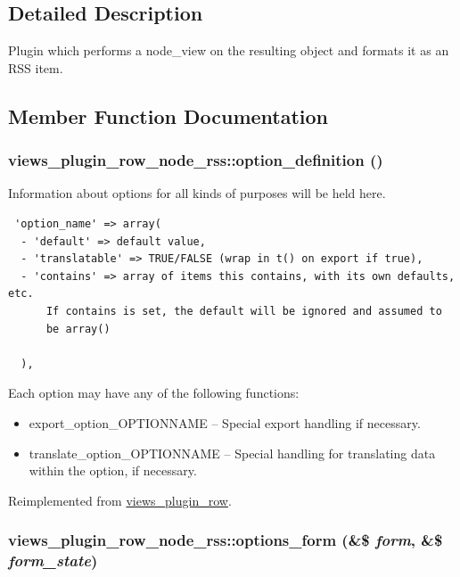 \subsection{Detailed Description}
Plugin which performs a node\_\-view on the resulting object and formats it as an RSS item. 

\subsection{Member Function Documentation}
\hypertarget{classviews__plugin__row__node__rss_160237bd0d2f6ee0e9c22cf7d08d8082}{
\subsubsection[{option\_\-definition}]{\setlength{\rightskip}{0pt plus 5cm}views\_\-plugin\_\-row\_\-node\_\-rss::option\_\-definition ()}}
\label{classviews__plugin__row__node__rss_160237bd0d2f6ee0e9c22cf7d08d8082}


Information about options for all kinds of purposes will be held here. 

\begin{Code}\begin{verbatim} 'option_name' => array(
  - 'default' => default value,
  - 'translatable' => TRUE/FALSE (wrap in t() on export if true),
  - 'contains' => array of items this contains, with its own defaults, etc.
      If contains is set, the default will be ignored and assumed to
      be array()

  ),
\end{verbatim}
\end{Code}

 Each option may have any of the following functions:\begin{itemize}
\item export\_\-option\_\-OPTIONNAME -- Special export handling if necessary.\item translate\_\-option\_\-OPTIONNAME -- Special handling for translating data within the option, if necessary. \end{itemize}


Reimplemented from \hyperlink{classviews__plugin__row_ad6be1492eae8605e9aff37da9f19337}{views\_\-plugin\_\-row}.\hypertarget{classviews__plugin__row__node__rss_074125b7562bb918124c2dae6322f58e}{
\subsubsection[{options\_\-form}]{\setlength{\rightskip}{0pt plus 5cm}views\_\-plugin\_\-row\_\-node\_\-rss::options\_\-form (\&\$ {\em form}, \/  \&\$ {\em form\_\-state})}}
\label{classviews__plugin__row__node__rss_074125b7562bb918124c2dae6322f58e}


